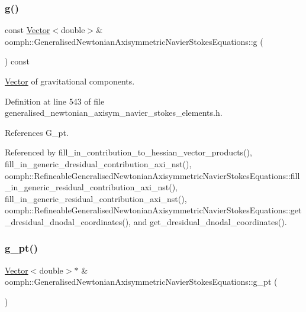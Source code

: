 \subsubsection{\texorpdfstring{g()}{g()}}
{\footnotesize\ttfamily const \hyperlink{classoomph_1_1Vector}{Vector}$<$double$>$\& oomph\+::\+Generalised\+Newtonian\+Axisymmetric\+Navier\+Stokes\+Equations\+::g (\begin{DoxyParamCaption}{ }\end{DoxyParamCaption}) const\hspace{0.3cm}{\ttfamily [inline]}}



\hyperlink{classoomph_1_1Vector}{Vector} of gravitational components. 



Definition at line 543 of file generalised\+\_\+newtonian\+\_\+axisym\+\_\+navier\+\_\+stokes\+\_\+elements.\+h.



References G\+\_\+pt.



Referenced by fill\+\_\+in\+\_\+contribution\+\_\+to\+\_\+hessian\+\_\+vector\+\_\+products(), fill\+\_\+in\+\_\+generic\+\_\+dresidual\+\_\+contribution\+\_\+axi\+\_\+nst(), oomph\+::\+Refineable\+Generalised\+Newtonian\+Axisymmetric\+Navier\+Stokes\+Equations\+::fill\+\_\+in\+\_\+generic\+\_\+residual\+\_\+contribution\+\_\+axi\+\_\+nst(), fill\+\_\+in\+\_\+generic\+\_\+residual\+\_\+contribution\+\_\+axi\+\_\+nst(), oomph\+::\+Refineable\+Generalised\+Newtonian\+Axisymmetric\+Navier\+Stokes\+Equations\+::get\+\_\+dresidual\+\_\+dnodal\+\_\+coordinates(), and get\+\_\+dresidual\+\_\+dnodal\+\_\+coordinates().

\mbox{\label{classoomph_1_1GeneralisedNewtonianAxisymmetricNavierStokesEquations_a955e87edee9243f468540bbc5cc2e87f}} 
\subsubsection{\texorpdfstring{g\+\_\+pt()}{g\_pt()}}
{\footnotesize\ttfamily \hyperlink{classoomph_1_1Vector}{Vector}$<$double$>$$\ast$ \& oomph\+::\+Generalised\+Newtonian\+Axisymmetric\+Navier\+Stokes\+Equations\+::g\+\_\+pt (\begin{DoxyParamCaption}{ }\end{DoxyParamCaption})\hspace{0.3cm}{\ttfamily [inline]}}



